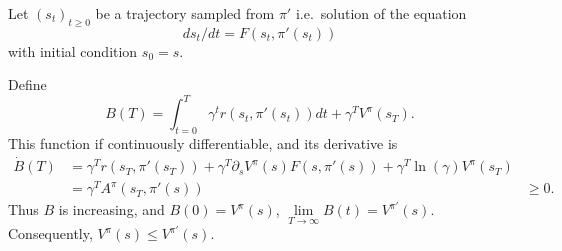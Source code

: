 Let $(s_t)_{t\geq 0}$ be a trajectory sampled from $\pi'$ i.e.\ solution of the equation
\begin{equation}
	ds_t / dt = F(s_t, \pi'(s_t))
\end{equation}
with initial condition $s_0 = s$.

Define
\begin{equation}
	B(T) = \int_{t=0}^T \gamma^t r(s_t, \pi'(s_t)) dt + \gamma^T V^\pi(s_T).
\end{equation}
This function if continuously differentiable, and its derivative is
\begin{align}
	\dot{B}(T) &= \gamma^T r(s_T, \pi'(s_T)) + \gamma^T \partial_s V^\pi(s) F(s, \pi'(s)) + \gamma^T \ln(\gamma) V^\pi(s_T)\\
		   &= \gamma^T A^\pi(s_T, \pi'(s))
		   &\geq 0.
\end{align}
Thus $B$ is increasing, and $B(0) = V^\pi(s)$, $\lim\limits_{T\rightarrow \infty} B(t) = V^{\pi'}(s)$.
Consequently, $V^\pi(s) \leq V^{\pi'}(s)$.


